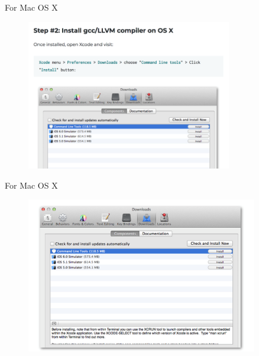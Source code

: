\documentclass[handout]{beamer}
\begin{document}
\begin{frame}{For Mac OS X}
    \begin{figure}[h]
        \centering
        \includegraphics[width=0.8\textwidth]{img/install_cmd_tools.png}
    \end{figure}
\end{frame}

\begin{frame}{For Mac OS X}
    \begin{figure}[h]
        \centering
        \includegraphics[width=0.9\textwidth]{img/install_cmd_tools_2.png}
    \end{figure}
\end{frame}
\end{document}
